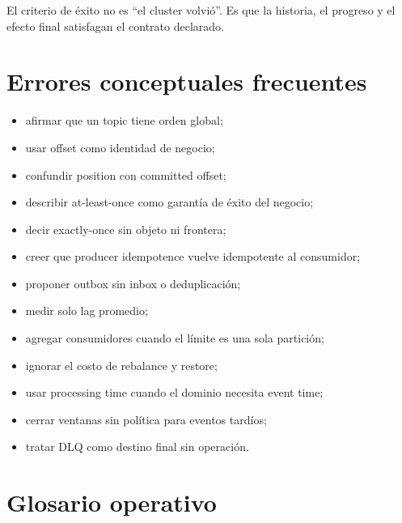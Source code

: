 \documentclass[variant=apuntes,cover=institutional,mode=screen]{ua-engineering-v6-article}
\begin{document}
El criterio de éxito no es ``el cluster volvió''. Es que la historia, el progreso y el efecto final satisfagan el contrato declarado.

\section{Errores conceptuales frecuentes}

\begin{itemize}
\item afirmar que un topic tiene orden global;
\item usar offset como identidad de negocio;
\item confundir position con committed offset;
\item describir at-least-once como garantía de éxito del negocio;
\item decir exactly-once sin objeto ni frontera;
\item creer que producer idempotence vuelve idempotente al consumidor;
\item proponer outbox sin inbox o deduplicación;
\item medir solo lag promedio;
\item agregar consumidores cuando el límite es una sola partición;
\item ignorar el costo de rebalance y restore;
\item usar processing time cuando el dominio necesita event time;
\item cerrar ventanas sin política para eventos tardíos;
\item tratar DLQ como destino final sin operación.
\end{itemize}

\section{Glosario operativo}
\end{document}

